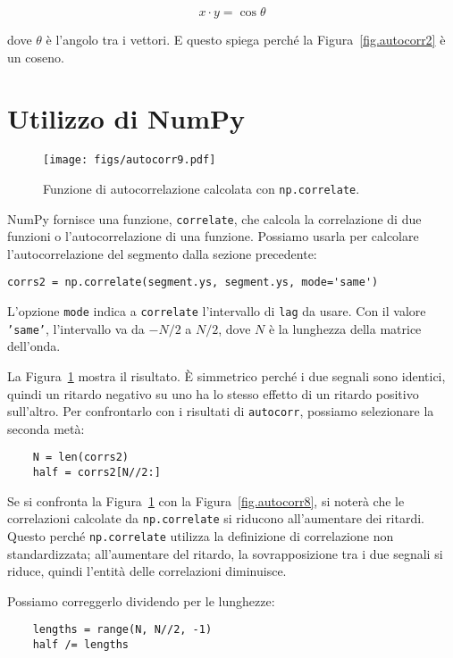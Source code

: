\documentclass[12pt,a4paper]{book}
\begin{document}
%
\[ x \cdot y = \cos \theta \] 

%
dove $\theta$ è l'angolo tra i vettori. E questo spiega perché la Figura~\ref{fig.autocorr2} è un coseno.

\section{Utilizzo di NumPy} \label{correlate} 

\begin{figure} 

\centerline{\texttt{[image: figs/autocorr9.pdf]}} \caption{Funzione di autocorrelazione calcolata con {\tt np.correlate}.} \label{fig.autocorr9} \end{figure} 

NumPy fornisce una funzione, {\tt correlate}, che calcola la correlazione di due funzioni o l'autocorrelazione di una funzione. Possiamo usarla per calcolare l'autocorrelazione del segmento dalla sezione precedente:

\begin{verbatim} 
corrs2 = np.correlate(segment.ys, segment.ys, mode='same')
 \end{verbatim} 

L'opzione {\tt mode} indica a {\tt correlate} l'intervallo di {\tt lag} da usare. Con il valore {\tt 'same'}, l'intervallo va da $-N/2$ a $N/2$, dove $N$ è la lunghezza della matrice dell'onda.

La Figura~\ref{fig.autocorr9} mostra il risultato. È simmetrico perché i due segnali sono identici, quindi un ritardo negativo su uno ha lo stesso effetto di un ritardo positivo sull'altro. Per confrontarlo con i risultati di {\tt autocorr}, possiamo selezionare la seconda metà:

\begin{verbatim} 
    N = len(corrs2)
    half = corrs2[N//2:]
 \end{verbatim} 

Se si confronta la Figura~\ref{fig.autocorr9} con la Figura~\ref{fig.autocorr8}, si noterà che le correlazioni calcolate da {\tt np.correlate} si riducono all'aumentare dei ritardi. Questo perché {\tt np.correlate} utilizza la definizione di correlazione non standardizzata; all'aumentare del ritardo, la sovrapposizione tra i due segnali si riduce, quindi l'entità delle correlazioni diminuisce.

Possiamo correggerlo dividendo per le lunghezze:

\begin{verbatim} 
    lengths = range(N, N//2, -1)
    half /= lengths
 \end{verbatim} 
\end{document}
